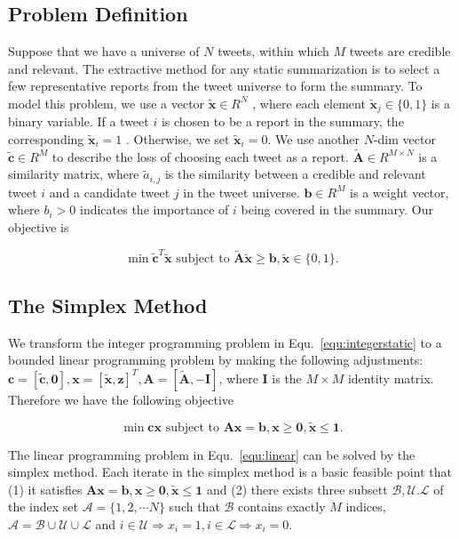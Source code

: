 \documentclass{llncs}
\begin{document}
\subsection{Problem Definition}
Suppose that we have a universe of $N$ tweets, within which $M$ tweets are credible and relevant. The extractive method for any static summarization is to select a few representative reports from the tweet universe to form the summary. To model this problem, we use a vector $\tilde{\mathbf{x}}\in R^N$ , where each element $\tilde{\mathbf{x}}_j\in \{0,1\}$ is a binary variable. If a tweet $i$ is chosen to be a report in the summary, the corresponding $\tilde{\mathbf{x}}_i=1$ . Otherwise, we set  $\tilde{\mathbf{x}}_i=0$. We use another $N$-dim vector $\tilde{\mathbf{c}}\in R^M$ to describe the loss of choosing each tweet as a report. $\tilde{\mathbf{A}}\in R^{M\times N}$  is a similarity matrix, where $\tilde{a}_{i,j}$  is the similarity between a credible and relevant tweet $i$ and a candidate tweet $j$ in the tweet universe. $\mathbf{b}\in R^{M}$ is a weight vector, where $b_{i}>0$ indicates the importance of $i$ being covered in the summary. Our objective is

\begin{equation}\label{equ:integerstatic}
\min \tilde{\mathbf{c}}^T\tilde{\mathbf{x}}\textrm{ subject to } \tilde{\mathbf{A}}\tilde{\mathbf{x}}\geq \mathbf{b}, \tilde{\mathbf{x}}\in \{0,1\}.
\end{equation}

\subsection{The Simplex Method}
We transform the integer programming problem in Equ.~\ref{equ:integerstatic} to a bounded linear programming problem by making the following adjustments: $\mathbf{c}=[\tilde{\mathbf{c}},\mathbf{0}],\mathbf{x}=[\tilde{\mathbf{x}},\mathbf{z}]^T,\mathbf{A}=[\tilde{\mathbf{A}},-\mathbf{I}]$, where $\mathbf{I}$ is the $M\times M$ identity matrix. Therefore we have the following objective

\begin{equation}\label{equ:linear}
\min \mathbf{cx} \textrm{ subject to } \mathbf{Ax} = \mathbf{b}, \mathbf{x}\geq \mathbf{0},\tilde{\mathbf{x}} \leq \mathbf{1}.
\end{equation}

The linear programming problem in Equ.~\ref{equ:linear} can be solved by the simplex method. Each iterate in the simplex method is a basic feasible point that (1) it satisfies $\mathbf{Ax} = \mathbf{b}, \mathbf{x}\geq \mathbf{0},\tilde{\mathbf{x}} \leq \mathbf{1}$ and (2) there exists three subsett $\mathcal{B,U.L}$ of the index set $\mathcal{A}=\{1,2,\cdots N\}$ such that $\mathcal{B}$ contains exactly $M$ indices, $\mathcal{A}=\mathcal{B}\cup \mathcal{U} \cup \mathcal{L}$ and $i \in \mathcal{U} \Rightarrow x_i=1,i \in \mathcal{L} \Rightarrow x_i=0$.
\end{document}
